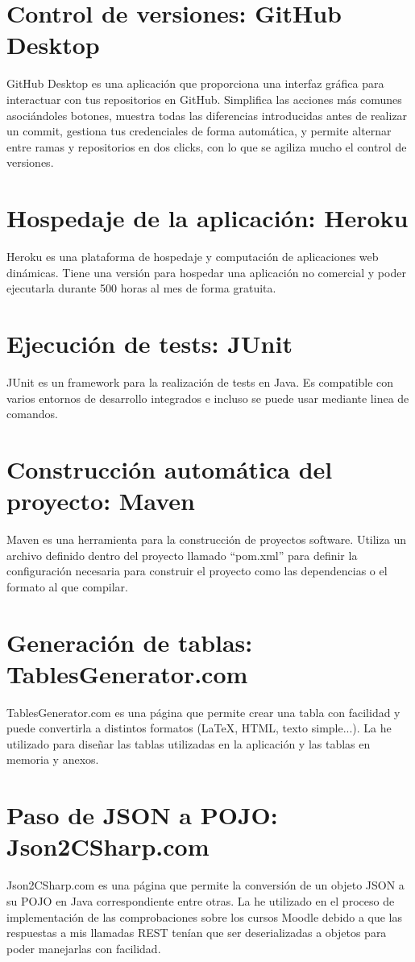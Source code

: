 \section{Control de versiones: GitHub Desktop}
GitHub Desktop es una aplicación que proporciona una interfaz gráfica para interactuar con tus repositorios en GitHub. Simplifica las acciones más comunes asociándoles botones, muestra todas las diferencias introducidas antes de realizar un commit, gestiona tus credenciales de forma automática, y permite alternar entre ramas y repositorios en dos clicks, con lo que se agiliza mucho el control de versiones.
\section{Hospedaje de la aplicación: Heroku}
Heroku es una plataforma de hospedaje y computación de aplicaciones web dinámicas. Tiene una versión para hospedar una aplicación no comercial y poder ejecutarla durante 500 horas al mes de forma gratuita.
\section{Ejecución de tests: JUnit}
JUnit es un framework para la realización de tests en Java. Es compatible con varios entornos de desarrollo integrados e incluso se puede usar mediante linea de comandos.
\section{Construcción automática del proyecto: Maven}
Maven es una herramienta para la construcción de proyectos software. Utiliza un archivo definido dentro del proyecto llamado ``pom.xml'' para definir la configuración necesaria para construir el proyecto como las dependencias o el formato al que compilar.
\section{Generación de tablas: TablesGenerator.com}
TablesGenerator.com es una página que permite crear una tabla con facilidad y puede convertirla a distintos formatos (LaTeX, HTML, texto simple...). La he utilizado para diseñar las tablas utilizadas en la aplicación y las tablas en memoria y anexos.
\section{Paso de JSON a POJO: Json2CSharp.com}
Json2CSharp.com es una página que permite la conversión de un objeto JSON a su POJO en Java correspondiente entre otras. La he utilizado en el proceso de implementación de las comprobaciones sobre los cursos Moodle debido a que las respuestas a mis llamadas REST tenían que ser deserializadas a objetos para poder manejarlas con facilidad.
